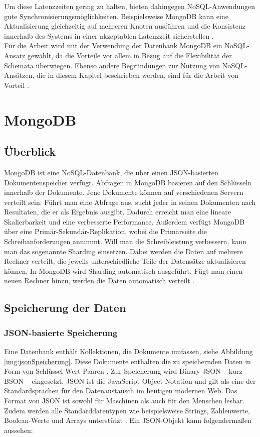 Um diese Latenzzeiten gering zu halten, bieten dahingegen NoSQL-Anwendungen gute Synchronisierungsmöglichkeiten. Beispielsweise MongoDB kann eine Aktualisierung gleichzeitig auf mehreren Knoten ausführen und die Konsistenz innerhalb des Systems in einer akzeptablen Latenzzeit sicherstellen \cite[S.19f.]{zwei}.\\
Für die Arbeit wird mit der Verwendung der Datenbank MongoDB ein NoSQL-Ansatz gewählt, da die Vorteile vor allem in Bezug auf die Flexibilität der Schemata überwiegen. Ebenso andere Begründungen zur Nutzung von NoSQL-Ansätzen, die in diesem Kapitel beschrieben werden, sind für die Arbeit von Vorteil \cite[S.17-20]{zwei}.

\chapter{MongoDB}

\section{Überblick}
MongoDB ist eine NoSQL-Datenbank, die über einen JSON-basierten Dokumentenspeicher verfügt. Abfragen in MongoDB basieren auf den Schlüsseln innerhalb der Dokumente. Jene Dokumente können auf verschiedenen Servern verteilt sein. Führt man eine Abfrage aus, sucht jeder in seinen Dokumenten nach Resultaten, die er als Ergebnis ausgibt. Dadurch erreicht man eine lineare Skalierbarkeit und eine verbesserte Performance. 
Außerdem verfügt MongoDB über eine Primär-Sekundär-Replikation, wobei die Primärseite die Schreibanforderungen annimmt. Will man die Schreibleistung verbessern, kann man das sogenannte Sharding einsetzen. Dabei werden die Daten auf mehrere Rechner verteilt, die jeweils unterschiedliche Teile der Datensätze aktualisieren können. In MongoDB wird Sharding automatisch ausgeführt. Fügt man einen neuen Rechner hinzu, werden die Daten automatisch verteilt \cite[S.26]{zwei}.

\section{Speicherung der Daten}
\subsection{JSON-basierte Speicherung}
Eine Datenbank enthält Kollektionen, die Dokumente umfassen, siehe Abbildung \ref*{img:jsonSpeicherung}. Diese Dokumente enthalten die zu speichernden Daten \cite[S.30]{zwei} in Form von Schlüssel-Wert-Paaren \cite[S.27]{zwei}. Zur Speicherung wird Binary JSON – kurz BSON – eingesetzt. JSON ist die JavaScript Object Notation und gilt als eine der Standardsprachen für den Datenaustausch im heutigen modernen Web. Das Format von JSON ist sowohl für Maschinen als auch für den Menschen lesbar. Zudem werden alle Standarddatentypen wie beispielsweise Strings, Zahlenwerte, Boolean-Werte und Arrays unterstützt \cite[S.31]{zwei}. Ein JSON-Objekt kann folgendermaßen aussehen:

